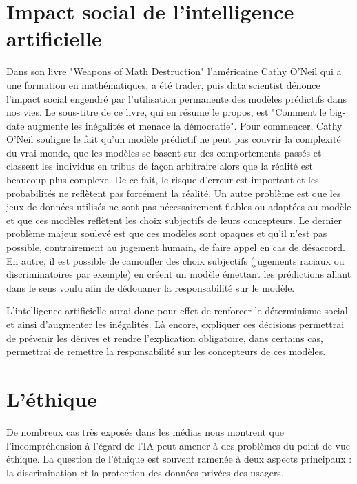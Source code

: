 \section{Impact social de l'intelligence artificielle}
Dans son livre "Weapons of Math Destruction" \cite{mathDestruction} l'américaine Cathy O'Neil qui a une formation en mathématiques, a été trader, puis data scientist dénonce l'impact social engendré par l'utilisation permanente des modèles prédictifs dans nos vies. Le sous-titre de ce livre, qui en résume le propos, est "Comment le big-date augmente les inégalités et menace la démocratie". Pour commencer, Cathy O'Neil souligne le fait qu'un modèle prédictif ne peut pas couvrir la complexité du vrai monde, que les modèles se basent sur des comportements passés et classent les individus en tribus de façon arbitraire alors que la réalité est beaucoup plus complexe. De ce fait, le risque d'erreur est important et les probabilités ne reflètent pas forcément la réalité. Un autre problème est que les jeux de données utilisés ne sont pas nécessairement fiables ou adaptées au modèle et que ces modèles reflètent les choix subjectifs de leurs concepteurs. Le dernier problème majeur soulevé est que ces modèles sont opaques et qu'il n'est pas possible, contrairement au jugement humain, de faire appel en cas de désaccord. En autre, il est possible de camoufler des choix subjectifs (jugements raciaux ou discriminatoires par exemple) en créent un modèle émettant les prédictions allant dans le sens voulu afin de dédouaner la responsabilité sur le modèle. \par
L'intelligence artificielle aurai donc pour effet de renforcer le déterminisme social et ainsi d'augmenter les inégalités. Là encore, expliquer ces décisions permettrai de prévenir les dérives et rendre l'explication obligatoire, dans certains cas, permettrai de remettre la responsabilité sur les concepteurs de ces modèles.

\section{L'éthique}
De nombreux cas très exposés dans les médias nous montrent que l'incompréhension à l'égard de l'IA peut amener à des problèmes du point de vue éthique. La question de l'éthique est souvent ramenée à deux aspects principaux : la discrimination et la protection des données privées des usagers.
